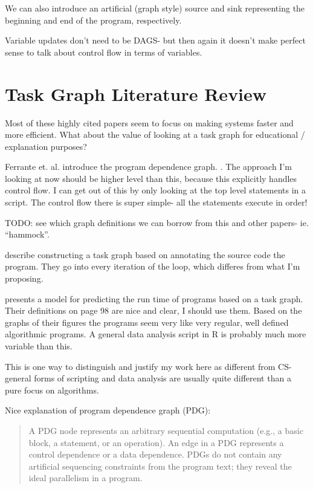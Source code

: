 \documentclass[12pt]{article}
\begin{document}
We can also introduce an artificial (graph style) source and sink representing the
beginning and end of the program, respectively.

Variable updates don't need to be DAGS- but then again it doesn't make
perfect sense to talk about control flow in terms of variables.

\section{Task Graph Literature Review}

Most of these highly cited papers seem to focus on making systems faster
and more efficient. What about the value of looking at a task graph for
educational / explanation purposes?

Ferrante et. al. introduce the program dependence graph.
\cite{ferrante1987}. The approach I'm looking at now should be higher level
than this, because this explicitly handles control flow. I can get out of
this by only looking at the top level statements in a script. The control
flow there is super simple- all the statements execute in order!

TODO: see which graph definitions we can borrow from this and other papers-
ie. ``hammock''.

\cite{cosnard1995automatic} describe constructing a task graph based on
annotating the source code the program. They go into every iteration of the
loop, which differes from what I'm proposing.

\cite{adve2004parallel} presents a model for predicting the run time of
programs based on a task graph. 
Their definitions on page 98 are nice and clear, I should use them.
Based on the graphs of their figures the
programs seem very like very regular, well defined algorithmic programs. A
general data analysis script in R is probably much more variable than this.

This is one way to distinguish and justify my work here as different from
CS- general forms of scripting and data analysis are usually quite
different than a pure focus on algorithms.

Nice explanation of program dependence graph (PDG):

\begin{quote}
    A PDG node represents
    an arbitrary sequential computation (e.g., a basic block, a
    statement, or an operation). An edge in a PDG represents
    a control dependence or a data dependence. PDGs do not
    contain any artificial sequencing constraints from the
    program text; they reveal the ideal parallelism in a
    program. \cite{sarkar1991automatic} 
\end{quote}
\end{document}
